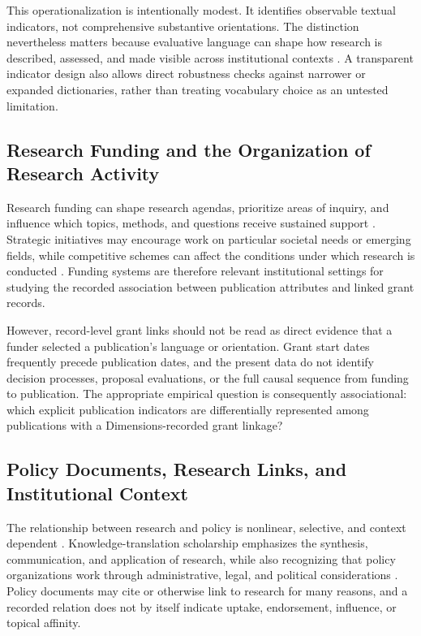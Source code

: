 \documentclass[12pt]{article}
\begin{document}
This operationalization is intentionally modest. It identifies observable textual indicators, not comprehensive substantive orientations. The distinction nevertheless matters because evaluative language can shape how research is described, assessed, and made visible across institutional contexts \citep{wouters2006,mller2017}. A transparent indicator design also allows direct robustness checks against narrower or expanded dictionaries, rather than treating vocabulary choice as an untested limitation.

\subsection{Research Funding and the Organization of Research Activity}

Research funding can shape research agendas, prioritize areas of inquiry, and influence which topics, methods, and questions receive sustained support \citep{laudel2014,franssen2018}. Strategic initiatives may encourage work on particular societal needs or emerging fields, while competitive schemes can affect the conditions under which research is conducted \citep{kayyali2025,cartier2018,schweiger2024}. Funding systems are therefore relevant institutional settings for studying the recorded association between publication attributes and linked grant records.

However, record-level grant links should not be read as direct evidence that a funder selected a publication's language or orientation. Grant start dates frequently precede publication dates, and the present data do not identify decision processes, proposal evaluations, or the full causal sequence from funding to publication. The appropriate empirical question is consequently associational: which explicit publication indicators are differentially represented among publications with a Dimensions-recorded grant linkage?

\subsection{Policy Documents, Research Links, and Institutional Context}

The relationship between research and policy is nonlinear, selective, and context dependent \citep{almeida2006,ritman2014}. Knowledge-translation scholarship emphasizes the synthesis, communication, and application of research, while also recognizing that policy organizations work through administrative, legal, and political considerations \citep{lauck2023,jaca2023,oelke2015}. Policy documents may cite or otherwise link to research for many reasons, and a recorded relation does not by itself indicate uptake, endorsement, influence, or topical affinity.
\end{document}
